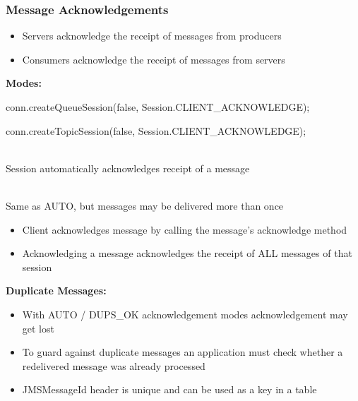 \documentclass[10pt]{article}
\begin{document}
\subsubsection{Message Acknowledgements}
\begin{itemize}
	\item Servers acknowledge the receipt of messages from producers
	\item Consumers acknowledge the receipt of messages from servers
\end{itemize}
\textbf{Modes:}
\begin{description}
	\item conn.createQueueSession(false, Session.CLIENT\_ACKNOWLEDGE);
	\item conn.createTopicSession(false, Session.CLIENT\_ACKNOWLEDGE);
	\item[AUTO\_ACKNOWLEDGE] \hfill \\
		Session automatically acknowledges receipt of a message
	\item[DUPS\_OK\_ACKNOWLEDGE] \hfill \\
		Same as AUTO, but messages may be delivered more than once
	\item[CLIENT\_ACKNOWLEDGE] \hfill
		\begin{itemize}
			\item Client acknowledges message by calling the message's acknowledge method
			\item Acknowledging a message acknowledges the receipt of ALL messages of that session
		\end{itemize}
\end{description}
\textbf{Duplicate Messages:}
\begin{itemize}
	\item With AUTO / DUPS\_OK acknowledgement modes acknowledgement may get lost
	\item To guard against duplicate messages an application must check whether a redelivered message was already processed
	\item JMSMessageId header is unique and can be used as a key in a table
\end{itemize}
\end{document}
